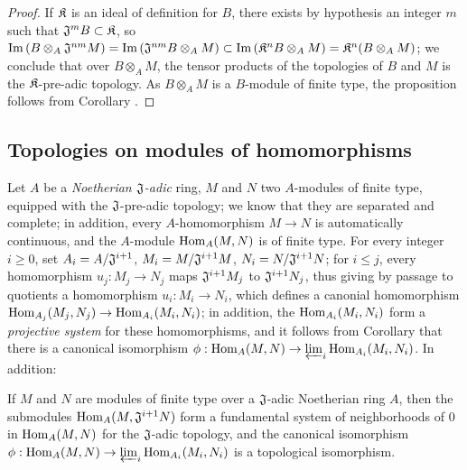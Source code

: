 \begin{proof}
\label{proof-0.7.7.8}
If $\mathfrak{K}$ is an ideal of definition for $B$, there exists by hypothesis an integer $m$ such
that $\mathfrak{J}^m B\subset\mathfrak{K}$, so
${\mathop{\mathrm{Im}}\nolimits}\,(B\otimes_A\mathfrak{J}^{nm}M)={\mathop{\mathrm{Im}}\nolimits}\,(\mathfrak{J}^{nm}B\otimes_A M)
  \subset{\mathop{\mathrm{Im}}\nolimits}\,(\mathfrak{K}^n B\otimes_A M)=\mathfrak{K}^n(B\otimes_A M)$;
we conclude that over $B\otimes_A M$, the tensor products of the topologies of $B$ and $M$ is the
$\mathfrak{K}$-pre-adic topology. As $B\otimes_A M$ is a $B$-module of finite type, the proposition
follows from Corollary .
\end{proof}

\subsection{Topologies on modules of homomorphisms}
\label{subsection-topologies-on-hom-modules}

\begin{env}[7.8.1]
\label{0.7.8.1}
Let $A$ be a \emph{Noetherian $\mathfrak{J}$-adic} ring, $M$ and $N$ two $A$-modules of finite type,
equipped with the $\mathfrak{J}$-pre-adic topology; we know  that they are
separated and complete; in addition, every $A$-homomorphism $M\to N$ is automatically continuous, and
the $A$-module ${\mathop{\mathrm{Hom}}\nolimits}_A(M,N)$ is of finite type. For every integer $i\geqslant 0$, set
$A_i=A/\mathfrak{J}^{i+1}$, $M_i=M/\mathfrak{J}^{i+1}M$, $N_i=N/\mathfrak{J}^{i+1}N$; for
$i\leqslant j$, every homomorphism $u_j:M_j\to N_j$ maps $\mathfrak{J}^{i+1}M_j$ to
$\mathfrak{J}^{i+1}N_j$, thus giving by passage to quotients a homomorphism $u_i:M_i\to N_i$, which
defines a canonial homomorphism ${\mathop{\mathrm{Hom}}\nolimits}_{A_j}(M_j,N_j)\to{\mathop{\mathrm{Hom}}\nolimits}_{A_i}(M_i,N_i)$; in addition, the
${\mathop{\mathrm{Hom}}\nolimits}_{A_i}(M_i,N_i)$ form a \emph{projective system} for these homomorphisms, and it follows from
Corollary  that there is a canonical isomorphism
$\phi:{\mathop{\mathrm{Hom}}\nolimits}_A(M,N)\to\varprojlim_i{\mathop{\mathrm{Hom}}\nolimits}_{A_i}(M_i,N_i)$. In addition:
\end{env}

\begin{prop}[7.8.2]
\label{0.7.8.2}
If $M$ and $N$ are modules of finite type over a $\mathfrak{J}$-adic Noetherian ring $A$, then the
submodules ${\mathop{\mathrm{Hom}}\nolimits}_A(M,\mathfrak{J}^{i+1}N)$ form a fundamental system of neighborhoods of $0$ in
${\mathop{\mathrm{Hom}}\nolimits}_A(M,N)$ for the $\mathfrak{J}$-adic topology, and the canonical isomorphism
$\phi:{\mathop{\mathrm{Hom}}\nolimits}_A(M,N)\to\varprojlim_i{\mathop{\mathrm{Hom}}\nolimits}_{A_i}(M_i,N_i)$ is a topological isomorphism.
\end{prop}

